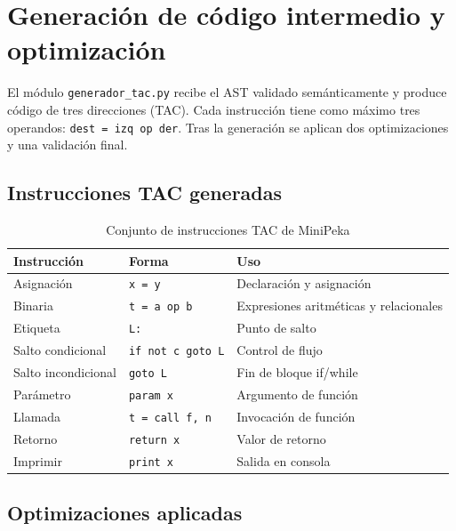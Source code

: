 \documentclass[12pt]{article}
\begin{document}
\section{Generación de código intermedio y optimización}

El módulo \texttt{generador\_tac.py} recibe el AST validado
semánticamente y produce código de tres direcciones (TAC).
Cada instrucción tiene como máximo tres operandos:
\texttt{dest = izq op der}. Tras la generación se aplican
dos optimizaciones y una validación final.

\subsection{Instrucciones TAC generadas}

\begin{table}[H]
\centering
\renewcommand{\arraystretch}{1.2}
\begin{tabular}{@{}p{3.8cm} p{4.2cm} p{4.8cm}@{}}
\toprule
\textbf{Instrucción} & \textbf{Forma} & \textbf{Uso} \\
\midrule
Asignación          & \texttt{x = y}            & Declaración y asignación \\
Binaria             & \texttt{t = a op b}       & Expresiones aritméticas y relacionales \\
Etiqueta            & \texttt{L:}               & Punto de salto \\
Salto condicional   & \texttt{if not c goto L}  & Control de flujo \\
Salto incondicional & \texttt{goto L}           & Fin de bloque if/while \\
Parámetro           & \texttt{param x}          & Argumento de función \\
Llamada             & \texttt{t = call f, n}    & Invocación de función \\
Retorno             & \texttt{return x}         & Valor de retorno \\
Imprimir            & \texttt{print x}          & Salida en consola \\
\bottomrule
\end{tabular}
\caption{Conjunto de instrucciones TAC de MiniPeka}
\end{table}

\subsection{Optimizaciones aplicadas}
\end{document}
